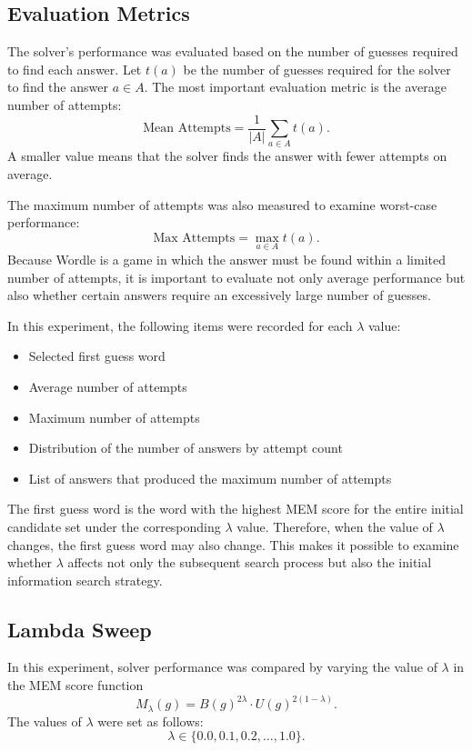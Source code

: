 \documentclass[11pt]{article}
\begin{document}
\subsection{Evaluation Metrics}

The solver's performance was evaluated based on the number of guesses required to find each answer.
Let $t(a)$ be the number of guesses required for the solver to find the answer $a \in A$.
The most important evaluation metric is the average number of attempts:
\[
\text{Mean Attempts}
=
\frac{1}{|A|}
\sum_{a \in A} t(a).
\]
A smaller value means that the solver finds the answer with fewer attempts on average.

The maximum number of attempts was also measured to examine worst-case performance:
\[
\text{Max Attempts}
=
\max_{a \in A} t(a).
\]
Because Wordle is a game in which the answer must be found within a limited number of attempts, it is important to evaluate not only average performance but also whether certain answers require an excessively large number of guesses.

In this experiment, the following items were recorded for each $\lambda$ value:
\begin{itemize}
    \item Selected first guess word
    \item Average number of attempts
    \item Maximum number of attempts
    \item Distribution of the number of answers by attempt count
    \item List of answers that produced the maximum number of attempts
\end{itemize}

The first guess word is the word with the highest MEM score for the entire initial candidate set under the corresponding $\lambda$ value.
Therefore, when the value of $\lambda$ changes, the first guess word may also change.
This makes it possible to examine whether $\lambda$ affects not only the subsequent search process but also the initial information search strategy.

\subsection{Lambda Sweep}

In this experiment, solver performance was compared by varying the value of $\lambda$ in the MEM score function
\[
M_{\lambda}(g)
=
B(g)^{2\lambda}
\cdot
U(g)^{2(1-\lambda)}.
\]
The values of $\lambda$ were set as follows:
\[
\lambda \in \{0.0, 0.1, 0.2, \ldots, 1.0\}.
\]
\end{document}
